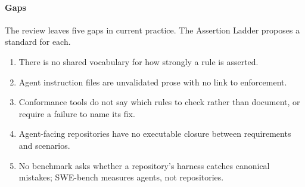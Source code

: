 \paragraph{Gaps} The review leaves five gaps in current practice. The Assertion Ladder proposes
a standard for each.
\begin{enumerate}[label=\textbf{G\arabic*},ref=G\arabic*,leftmargin=*,nosep]
  \item\label{gap:vocabulary} There is no shared vocabulary for how strongly a rule is asserted.
  \item\label{gap:prose} Agent instruction files are unvalidated prose with no link to enforcement.
  \item\label{gap:selection} Conformance tools do not say which rules to check rather than
    document, or require a failure to name its fix.
  \item\label{gap:closure} Agent-facing repositories have no executable closure between
    requirements and scenarios.
  \item\label{gap:benchmark} No benchmark asks whether a repository's harness catches canonical
    mistakes; SWE-bench measures agents, not repositories.
\end{enumerate}
